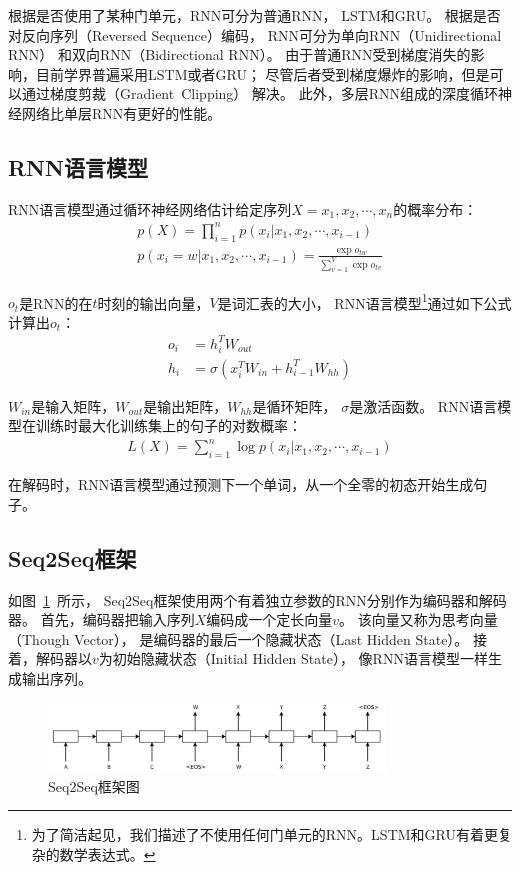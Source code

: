 根据是否使用了某种门单元，RNN可分为普通RNN，
LSTM和GRU。
根据是否对反向序列（Reversed Sequence）编码，
RNN可分为单向RNN（Unidirectional RNN）
和双向RNN（Bidirectional RNN）。
由于普通RNN受到梯度消失的影响，目前学界普遍采用LSTM或者GRU；
尽管后者受到梯度爆炸的影响，但是可以通过梯度剪裁（Gradient~Clipping）
解决。
此外，多层RNN组成的深度循环神经网络比单层RNN有更好的性能。

\subsection{RNN语言模型}\label{subsec:RNNLM}
RNN语言模型通过循环神经网络估计给定序列$X=x_1, x_2, \cdots, x_n$的概率分布：
\begin{align}
    p(X) = \prod_{i=1}^{n} p(x_i|x_1, x_2, \cdots, x_{i-1})
    \label{eqn:language_model_probability} \\
    p(x_i = w|x_1, x_2, \cdots, x_{i-1}) = \frac{\exp{o_{tw}}}{\sum_{v=1}^V \exp{o_{tv}}}
    \label{eqn:language_model_estimation}
\end{align}

$o_t$是RNN的在$t$时刻的输出向量，$V$是词汇表的大小，
RNN语言模型\footnote{为了简洁起见，我们描述了不使用任何门单元的RNN。LSTM和GRU有着更复杂的数学表达式。}通过如下公式计算出$o_t$：
\begin{align}
    o_i &= h_i^T W_{out} \\
    h_i &= \sigma \left( x_i^T W_{in} + h_{i-1}^T W_{hh} \right)
\end{align}

$W_{in}$是输入矩阵，$W_{out}$是输出矩阵，$W_{hh}$是循环矩阵，
$\sigma$是激活函数。
RNN语言模型在训练时最大化训练集上的句子的对数概率：
\begin{align}
    \mathit{L(X)} = \sum_{i=1}^n \log p(x_i|x_1, x_2, \cdots, x_{i-1})
\end{align}

在解码时，RNN语言模型通过预测下一个单词，从一个全零的初态开始生成句子。

\subsection{Seq2Seq框架}\label{subsec:Seq2Seq}
如图~\ref{fig:Seq2Seq}~所示，
Seq2Seq框架使用两个有着独立参数的RNN分别作为编码器和解码器。
首先，编码器把输入序列$X$编码成一个定长向量$v$。
该向量又称为思考向量（Though Vector），
是编码器的最后一个隐藏状态（Last Hidden State）。
接着，解码器以$v$为初始隐藏状态（Initial Hidden State），
像RNN语言模型一样生成输出序列。
\begin{figure}[H]
    \centering
    \includegraphics[width=0.8\textwidth]{figure/Seq2Seq.png}
    \caption{Seq2Seq框架图}
    \label{fig:Seq2Seq}
\end{figure}


